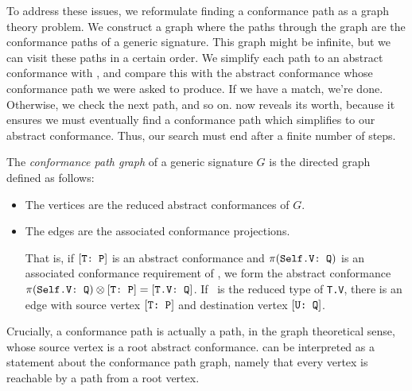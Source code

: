 \documentclass[../generics]{subfiles}
\begin{document}
To address these issues, we reformulate finding a conformance path as a graph theory problem. We construct a graph where the paths through the graph are the conformance paths of a generic signature. This graph might be infinite, but we can visit these paths in a certain order. We simplify each path to an abstract conformance with , and compare this with the abstract conformance whose conformance path we were asked to produce. If we have a match, we're done. Otherwise, we check the next path, and so on.  now reveals its worth, because it ensures we must eventually find a conformance path which simplifies to our abstract conformance. Thus, our search must end after a finite number of steps.

\begin{definition}
The \emph{conformance path graph} of a generic signature $G$ is the directed graph defined as follows:
\begin{itemize}
\item The vertices are the reduced abstract conformances of $G$.
\item The edges are the associated conformance projections.

That is, if $[\texttt{T:~P}]$ is an abstract conformance and $\pi(\texttt{Self.V:~Q})$ is an associated conformance requirement of \tP, we form the abstract conformance $\pi(\texttt{Self.V:~Q})\otimes [\texttt{T:~P}]=[\texttt{T.V:~Q}]$. If \tU\ is the reduced type of \texttt{T.V}, there is an edge with source vertex $[\texttt{T:~P}]$ and destination vertex $[\texttt{U:~Q}]$.
\end{itemize}

\vfill
\eject

Crucially, a conformance path is actually a path, in the graph theoretical sense, whose source vertex is a root abstract conformance.  can be interpreted as a statement about the conformance path graph, namely that every vertex is reachable by a path from a root vertex.
\end{definition}
\end{document}
